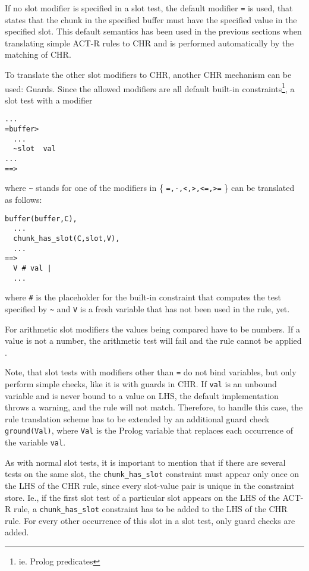 If no slot modifier is specified in a slot test, the default modifier \verb|=| is used, that states that the chunk in the specified buffer must have the specified value in the specified slot. This default semantics has been used in the previous sections when translating simple ACT-R rules to CHR and is performed automatically by the matching of CHR.

To translate the other slot modifiers to CHR, another CHR mechanism can be used: Guards. Since the allowed modifiers are all default built-in constraints\footnote{ie. Prolog predicates}, a slot test with a modifier

\begin{lstlisting}
...
=buffer>
  ...
  ~slot  val
...
==>
\end{lstlisting}

where \verb|~| stands for one of the modifiers in \{ \verb|=,-,<,>,<=,>=| \} can be translated as follows:

\begin{lstlisting}
buffer(buffer,C),
  ...
  chunk_has_slot(C,slot,V),
  ...
==>
  V # val |
  ...
\end{lstlisting}

where \verb|#| is the placeholder for the built-in constraint that computes the test specified by \verb|~| and \verb|V| is a fresh variable that has not been used in the rule, yet.

For arithmetic slot modifiers the values being compared have to be numbers. If a value is not a number, the arithmetic test will fail and the rule cannot be applied \cite{actr_reference}.

Note, that slot tests with modifiers other than \verb|=| do not bind variables, but only perform simple checks, like it is with guards in CHR. If \verb|val| is an unbound variable and is never bound to a value on LHS, the default implementation throws a warning, and the rule will not match. Therefore, to handle this case, the rule translation scheme has to be extended by an additional guard check \verb|ground(Val)|, where \verb|Val| is the Prolog variable that replaces each occurrence of the variable \verb|val|.

As with normal slot tests, it is important to mention that if there are several tests on the same slot, the \verb|chunk_has_slot| constraint must appear only once on the LHS of the CHR rule, since every slot-value pair is unique in the constraint store. Ie., if the first slot test of a particular slot appears on the LHS of the ACT-R rule, a \verb|chunk_has_slot| constraint has to be added to the LHS of the CHR rule. For every other occurrence of this slot in a slot test, only guard checks are added.

